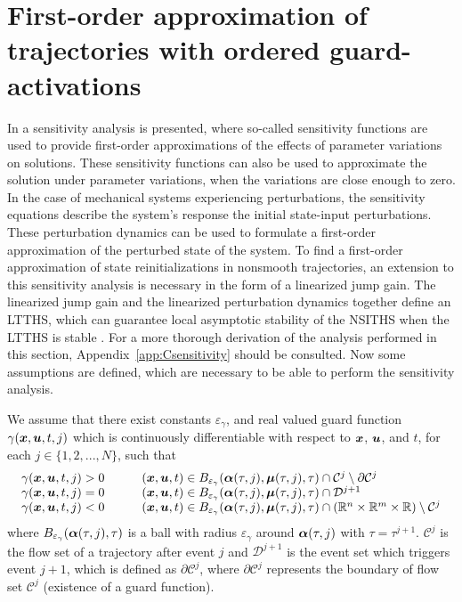 \documentclass[../DC2017114Bouma.tex]{subfiles}
\begin{document}
\section{First-order approximation of trajectories with ordered guard-activations}\label{sec:3approx}
In \cite{Khalil1996} a sensitivity analysis is presented, where so-called sensitivity functions are used to provide first-order approximations of the effects of parameter variations on solutions. These sensitivity functions can also be used to approximate the solution under parameter variations, when the variations are close enough to zero. In the case of mechanical systems experiencing perturbations, the sensitivity equations describe the system's response the initial state-input perturbations. These perturbation dynamics can be used to formulate a first-order approximation of the perturbed state of the system. To find a first-order approximation of state reinitializations in nonsmooth trajectories, an extension to this sensitivity analysis is necessary in the form of a linearized jump gain. The linearized jump gain and the linearized perturbation dynamics together define an LTTHS, which can guarantee local asymptotic stability of the NSITHS when the LTTHS is stable \cite{Rijnen2017}. For a more thorough derivation of the analysis performed in this section, Appendix~\ref{app:Csensitivity} should be consulted. Now some assumptions are defined, which are necessary to be able to perform the sensitivity analysis.

\begin{myass}\label{ass:existence}
We assume that there exist constants $\varepsilon_\gamma$, and real valued guard function $\gamma({\boldsymbol{x}},{\boldsymbol{u}},t,j)$ which is continuously differentiable with respect to ${\boldsymbol{x}}$, ${\boldsymbol{u}}$, and $t$, for each $j\in \{1,2,...,N\}$, such that
\begin{equation}
\begin{array}{llll}
\gamma({\boldsymbol{x}},{\boldsymbol{u}},t,j) > 0 & &	&({\boldsymbol{x}},{\boldsymbol{u}},t) \in B_{\varepsilon_\gamma}(\boldsymbol{\alpha}(\tau,j),\boldsymbol{\mu}(\tau,j),\tau)\cap \mathcal{C}^j\setminus\partial \mathcal{C}^j\\
\gamma({\boldsymbol{x}},{\boldsymbol{u}},t,j) = 0 & &	&({\boldsymbol{x}},{\boldsymbol{u}},t) \in B_{\varepsilon_\gamma}(\boldsymbol{\alpha}(\tau,j),\boldsymbol{\mu}(\tau,j),\tau)\cap \mathcal{D}^{j+1}\\
\gamma({\boldsymbol{x}},{\boldsymbol{u}},t,j) < 0 & &	&({\boldsymbol{x}},{\boldsymbol{u}},t) \in B_{\varepsilon_\gamma}(\boldsymbol{\alpha}(\tau,j),\boldsymbol{\mu}(\tau,j),\tau)\cap (\mathbb{R}^n \times \mathbb{R}^m \times \mathbb{R})\setminus \mathcal{C}^j
\end{array}
\end{equation}
where $B_{\varepsilon_{\gamma}}(\boldsymbol{\alpha}(\tau,j),\tau)$ is a ball with radius $\varepsilon_{\gamma}$ around $\boldsymbol{\alpha}(\tau,j)$ with $\tau = \tau^{j+1}$. $\mathcal{C}^j$ is the flow set of a trajectory after event $j$ and $\mathcal{D}^{j+1}$ is the event set which triggers event $j+1$, which is defined as $\partial \mathcal{C}^j$, where $\partial \mathcal{C}^j$ represents the boundary of flow set $\mathcal{C}^j$ (existence of a guard function).
\end{myass}
\end{document}

